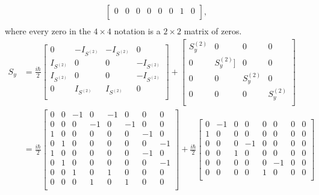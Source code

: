 \begin{example}
\begin{equation}
\begin{split}
\begin{bmatrix}
				0 & 0 & 0 & 0 & 0 & 0 & 1 & 0 \\
			\end{bmatrix} ,\\
		\end{split}
	\end{equation} 
	where every zero in the $4\times4$ notation is a $2\times2$ matrix of zeros.
	\begin{equation}
		\begin{split}
			S_y&=\frac{i\hbar}{2}\begin{bmatrix}
				0 & -I_{S^{(2)}} & -I_{S^{(2)}} & 0 \\
				I_{S^{(2)}} & 0 & 0 & -I_{S^{(2)}} \\
				I_{S^{(2)}} & 0 & 0 & -I_{S^{(2)}} \\
				0 & I_{S^{(2)}} & I_{S^{(2)}} & 0 \\
			\end{bmatrix}+\begin{bmatrix}
				S^{(2)}_y & 0 & 0 & 0 \\
				0 & S^{(2)}_y] & 0 & 0 \\
				0 & 0 & S^{(2)}_y & 0 \\
				0 & 0 & 0 & S^{(2)}_y \\
			\end{bmatrix} \\
			&=\frac{i\hbar}{2}\begin{bmatrix}
				0 & 0 & -1 & 0 & -1 & 0 & 0 & 0 \\
				0 & 0 & 0 & -1 & 0 & -1 & 0 & 0 \\
				1 & 0 & 0 & 0 & 0 & 0 & -1 & 0 \\
				0 & 1 & 0 & 0 & 0 & 0 & 0 & -1 \\
				1 & 0 & 0 & 0 & 0 & 0 & -1 & 0 \\
				0 & 1 & 0 & 0 & 0 & 0 & 0 & -1 \\
				0 & 0 & 1 & 0 & 1 & 0 & 0 & 0 \\
				0 & 0 & 0 & 1 & 0 & 1 & 0 & 0 \\
			\end{bmatrix}+\frac{i\hbar}{2}\begin{bmatrix}
				0 & -1 & 0 & 0 & 0 & 0 & 0 & 0 \\
				1 & 0 & 0 & 0 & 0 & 0 & 0 & 0 \\
				0 & 0 & 0 & -1 & 0 & 0 & 0 & 0 \\
				0 & 0 & 1 & 0 & 0 & 0 & 0 & 0 \\
				0 & 0 & 0 & 0 & 0 & -1 & 0 & 0 \\
				0 & 0 & 0 & 0 & 1 & 0 & 0 & 0 \\

\end{bmatrix}
\end{split}
\end{equation}
\end{example}
